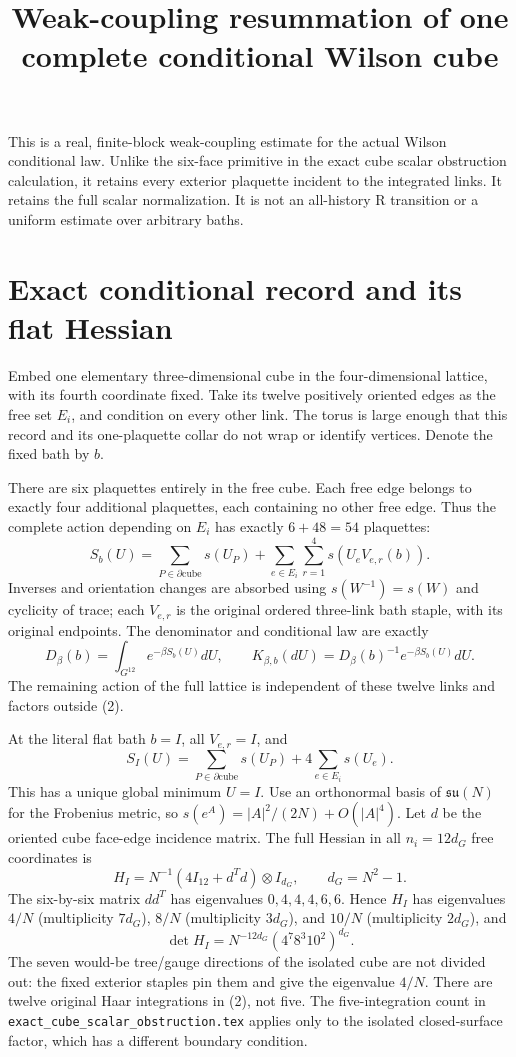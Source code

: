 \documentclass{article}
\title{Weak-coupling resummation of one complete conditional Wilson cube}\author{}\date{}
\begin{document}
\maketitle
This is a real, finite-block weak-coupling estimate for the actual Wilson conditional law. Unlike the six-face primitive in the exact cube scalar obstruction calculation, it retains every exterior plaquette incident to the integrated links. It retains the full scalar normalization. It is not an all-history R transition or a uniform estimate over arbitrary baths.

\section{Exact conditional record and its flat Hessian}
Embed one elementary three-dimensional cube in the four-dimensional lattice, with its fourth coordinate fixed. Take its twelve positively oriented edges as the free set $E_i$, and condition on every other link. The torus is large enough that this record and its one-plaquette collar do not wrap or identify vertices. Denote the fixed bath by $b$.

There are six plaquettes entirely in the free cube. Each free edge belongs to exactly four additional plaquettes, each containing no other free edge. Thus the complete action depending on $E_i$ has exactly $6+48=54$ plaquettes:
\[
 S_b(U)=\sum_{P\in\partial\text{cube}}s(U_P)
 +\sum_{e\in E_i}\sum_{r=1}^{4}s(U_eV_{e,r}(b)).
 \tag{1}
\]
Inverses and orientation changes are absorbed using $s(W^{-1})=s(W)$ and cyclicity of trace; each $V_{e,r}$ is the original ordered three-link bath staple, with its original endpoints. The denominator and conditional law are exactly
\[
 D_\beta(b)=\int_{G^{12}}e^{-\beta S_b(U)}dU,
 \qquad K_{\beta,b}(dU)=D_\beta(b)^{-1}e^{-\beta S_b(U)}dU.
 \tag{2}
\]
The remaining action of the full lattice is independent of these twelve links and factors outside (2).

At the literal flat bath $b=I$, all $V_{e,r}=I$, and
\[
 S_I(U)=\sum_{P\in\partial\text{cube}}s(U_P)+4\sum_{e\in E_i}s(U_e).
 \tag{3}
\]
This has a unique global minimum $U=I$. Use an orthonormal basis of $\mathfrak{su}(N)$ for the Frobenius metric, so $s(e^A)=|A|^2/(2N)+O(|A|^4)$. Let $d$ be the oriented cube face-edge incidence matrix. The full Hessian in all $n_i=12d_G$ free coordinates is
\[
 H_I=N^{-1}(4I_{12}+d^Td)\otimes I_{d_G},\qquad d_G=N^2-1.
 \tag{4}
\]
The six-by-six matrix $dd^T$ has eigenvalues $0,4,4,4,6,6$. Hence $H_I$ has eigenvalues $4/N$ (multiplicity $7d_G$), $8/N$ (multiplicity $3d_G$), and $10/N$ (multiplicity $2d_G$), and
\[
 \det H_I=N^{-12d_G}(4^7 8^3 10^2)^{d_G}.
 \tag{5}
\]
The seven would-be tree/gauge directions of the isolated cube are not divided out: the fixed exterior staples pin them and give the eigenvalue $4/N$. There are twelve original Haar integrations in (2), not five. The five-integration count in \texttt{exact\_cube\_scalar\_obstruction.tex} applies only to the isolated closed-surface factor, which has a different boundary condition.
\end{document}
